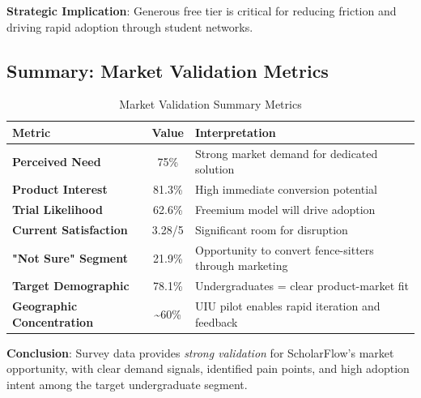 {\bfseries Strategic Implication}: Generous free tier is critical for reducing friction and driving rapid adoption through student networks.

\subsection{Summary: Market Validation Metrics}

\begin{table}[H]
    \centering
    \begin{tabularx}{\textwidth}{|l|c|X|}
        \hline
        \textbf{Metric}                 & \textbf{Value}        & \textbf{Interpretation} \\
        \hline
        {\bfseries Perceived Need}           & 75\%                  &
        Strong market demand for dedicated solution                                       \\
        \hline
        {\bfseries Product Interest}         & 81.3\%                &
        High immediate conversion potential                                               \\
        \hline
        {\bfseries Trial Likelihood}         & 62.6\%                &
        Freemium model will drive adoption                                                \\
        \hline
        {\bfseries Current Satisfaction}     & 3.28/5                &
        Significant room for disruption                                                   \\
        \hline
        {\bfseries "Not Sure" Segment}       & 21.9\%                &
        Opportunity to convert fence-sitters through marketing                            \\
        \hline
        {\bfseries Target Demographic}       & 78.1\%                &
        Undergraduates = clear product-market fit                                         \\
        \hline
        {\bfseries Geographic Concentration} & \textasciitilde{}60\% &
        UIU pilot enables rapid iteration and feedback                                    \\
        \hline
    \end{tabularx}
    \caption{Market Validation Summary Metrics}
    \label{table:validation-metrics}
\end{table}

\textbf{Conclusion}: Survey data provides \textit{strong validation} for ScholarFlow's market opportunity, with clear demand signals, identified pain points, and high adoption intent among the target undergraduate segment.
